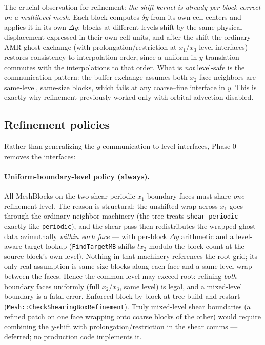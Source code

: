 \documentclass[11pt]{article}
\newcommand{\code}[1]{\texttt{#1}}
\begin{document}
The crucial observation for refinement: \emph{the shift kernel is already per-block
correct on a multilevel mesh}. Each block computes $\delta y$ from its own cell
centers and applies it in its own $\Delta y$; blocks at different levels shift by the
same physical displacement expressed in their own cell units, and after the shift the
ordinary AMR ghost exchange (with prolongation/restriction at $x_1$/$x_3$ level
interfaces) restores consistency to interpolation order, since a uniform-in-$y$
translation commutes with the interpolations to that order. What is \emph{not}
level-safe is the communication pattern: the buffer exchange assumes both $x_2$-face
neighbors are same-level, same-size blocks, which fails at any coarse--fine interface
in $y$. This is exactly why refinement previously worked only with orbital advection
disabled.

\subsection{Refinement policies}
\label{sec:policy}
Rather than generalizing the $y$-communication to level interfaces, Phase 0 removes
the interfaces:

\paragraph{Uniform-boundary-level policy (always).} All MeshBlocks on the two
shear-periodic $x_1$ boundary faces must share \emph{one} refinement level. The
reason is structural: the unshifted wrap across $x_1$ goes through the ordinary
neighbor machinery (the tree treats \code{shear\_periodic} exactly like
\code{periodic}), and the shear pass then redistributes the wrapped ghost data
azimuthally \emph{within each face} --- with per-block $\Delta y$ arithmetic and a
level-aware target lookup (\code{FindTargetMB} shifts $lx_2$ modulo the block count
at the source block's own level). Nothing in that machinery references the root
grid; its only real assumption is same-size blocks along each face and a same-level
wrap between the faces. Hence the common level may exceed root: refining
\emph{both} boundary faces uniformly (full $x_2$/$x_3$, same level) is legal, and a
mixed-level boundary is a fatal error. Enforced block-by-block at tree build and
restart (\code{Mesh::CheckShearingBoxRefinement}). Truly mixed-level shear
boundaries (a refined patch on one face wrapping onto coarse blocks of the other)
would require combining the $y$-shift with prolongation/restriction in the shear
comms --- deferred; no production code implements it.
\end{document}
